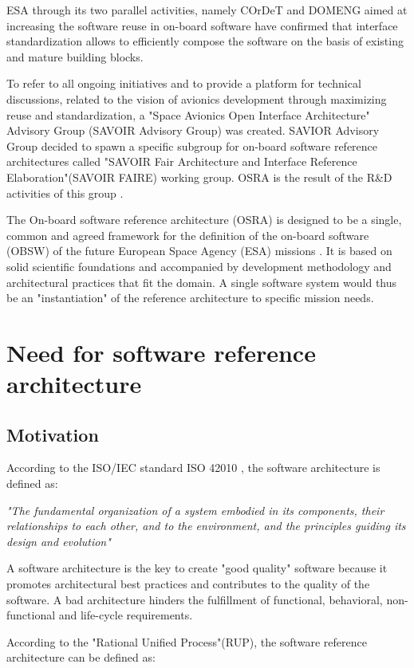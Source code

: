 ESA through its two parallel activities, namely COrDeT and DOMENG \cite{CORDET} aimed at increasing the software reuse in on-board software have confirmed that interface standardization allows to efficiently compose the software on the basis of existing and mature building blocks.

To refer to all ongoing initiatives and to provide a platform for technical discussions, related to the vision of avionics development through maximizing reuse and standardization, a "Space Avionics Open Interface Architecture" Advisory Group (SAVOIR Advisory Group) was created. SAVIOR Advisory Group decided to spawn a specific subgroup for on-board software reference architectures called "SAVOIR Fair Architecture and Interface Reference Elaboration"(SAVOIR FAIRE) working group. OSRA is the result of the R\&D activities of this group \cite{SAVOIR}.   

The On-board software reference architecture (OSRA) is designed to be a single, common and agreed framework for the definition of the on-board software (OBSW) of the future European Space Agency (ESA) missions \cite{SAVOIR}. It is based on solid scientific foundations and accompanied by development methodology and architectural practices that fit the domain. A single software system would thus be an "instantiation" of the reference architecture to specific mission needs.

\section{Need for software reference architecture}
\subsection{Motivation}
According to the ISO/IEC standard ISO 42010 \cite{ISO42010}, the software architecture is defined as: 

\textit{"The fundamental organization of a system embodied in its components, their relationships
to each other, and to the environment, and the principles guiding its design and evolution"}
 
A software architecture is the key to create "good quality" software because it promotes architectural best practices and contributes to the quality of the software. A bad architecture hinders the fulfillment of functional, behavioral, non-functional and life-cycle requirements.

According to the "Rational Unified Process"(RUP)\cite{RUP}, the software reference architecture can be defined as:

